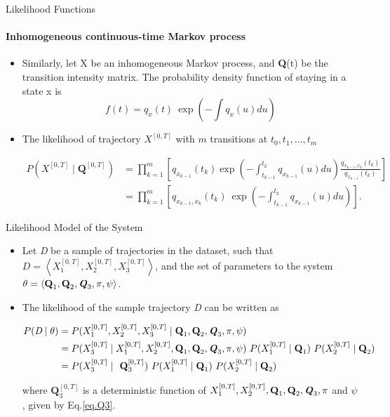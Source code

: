 \documentclass[
	english,%
	aspectratio=169,%
	color={accentcolor=3b},
	logo=true,%
	colorframetitle=false,%
	]{tudabeamer}
\begin{document}
\begin{frame}{Likelihood Functions}
\framesubtitle{Inhomogeneous continuous-time Markov process}
\begin{itemize}
	\item Similarly, let X be an inhomogeneous Markov process, and \textbf{Q}(t) be the transition intensity matrix. The probability density function of staying in a state x is
	\begin{equation}
	f(t) = q_{x}(t)\ \exp\left( -\int q_{x}(u)du\right)
	\end{equation}
	\item The likelihood of trajectory $X^{[0,T]}$ with $ m $ transitions at $ t_{0}, t_{1}, ..., t_{m} $ \cite{Perez-Ocon2000}

	\begin{align}
	P(X^{[0,T]} \mid \textbf{Q}^{[0,T]}) & = \prod_{k=1}^{m} \left[ q_{x_{k-1}} (t_{k}) \exp \left(-\int_{t_{k-1}}^{t_{k}} q_{x_{k-1}}(u) d u\right) \frac{q_{x_{k-1}, x_{k}} (t_{k})}{q_{x_{k-1}}(t_{k})}\right] \nonumber\\ & =  \prod_{k=1}^{m} \left[q_{x_{k-1}, x_{k}}(t_{k})\ \exp \left(-\int_{t_{k-1}}^{t_{k}} q_{x_{k-1}}(u) d u\right)\right] .
	\end{align}

\end{itemize}
\end{frame}


\begin{frame}{Likelihood Model of the System}
\begin{itemize}
	\item Let \textit{D} be a sample of trajectories in the dataset, such that $ \textit{D} = \left\langle X_{1}^{[0, T]}, X_{2}^{[0, T]}, X_{3}^{[0, T]} \right\rangle  $, and the set of parameters to the system $  \theta = \left\langle \textbf{Q}_{1}, \textbf{Q}_{2}, \textbf{\textit{Q}}_{3}, \pi, \psi \right\rangle  $.
	\item The likelihood of the sample trajectory \textit{D} can be written as

	\begin{align}
	P(\textit{D} \mid \theta ) & = P(X_{1}^{[0, T]}, X_{2}^{[0, T]}, X_{3}^{[0, T]} \mid \textbf{Q}_{1}, \textbf{Q}_{2}, \textbf{\textit{Q}}_{3}, \pi, \psi) \nonumber\\ & = P(X_{3}^{[0, T]} \mid X_{1}^{[0, T]}, X_{2}^{[0, T]}, \textbf{Q}_{1}, \textbf{Q}_{2}, \textbf{\textit{Q}}_{3}, \pi, \psi) \ P(X_{1}^{[0, T]}\mid \textbf{Q}_{1}) \ P(X_{2}^{[0, T]}\mid \textbf{Q}_{2}) \nonumber\\ & = P(X_{3}^{[0, T]}\mid \textbf{ Q}_{3}^{[0, T]}) \ P(X_{1}^{[0, T]}\mid \textbf{Q}_{1}) \ P(X_{2}^{[0, T]}\mid \textbf{Q}_{2}) 
	\end{align}

	where $ \textbf{Q}_{3}^{[0, T]} $ is a deterministic function of $X_{1}^{[0, T]}, X_{2}^{[0, T]}, \textbf{Q}_{1}, \textbf{Q}_{2}, \textbf{\textit{Q}}_{3}, \pi $ and $ \psi $, given by Eq.\ref{eq.Q3}.
\end{itemize}
\end{frame}
\end{document}
